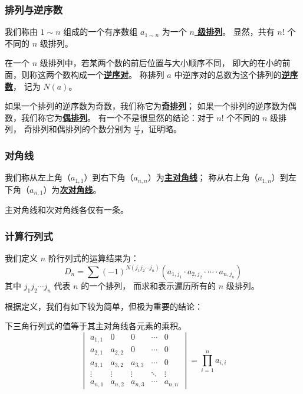 \documentclass[UTF8]{article}
\begin{document}
	\subsubsection{排列与逆序数}

	我们称由 $1 \sim n$ 组成的一个有序数组
	$a_{1 \sim n}$ 为一个 \textbf{\uline{$n$ 级排列}}。
	显然，共有 $n!$ 个不同的 $n$ 级排列。

	在一个 $n$ 级排列中，若某两个数的前后位置与大小顺序不同，
	即大的在小的前面，则称这两个数构成一个\textbf{\uline{逆序对}}。
	称排列 $a$ 中逆序对的总数为这个排列的\textbf{\uline{逆序数}}，
	记为 $N(a)$。

	如果一个排列的逆序数为奇数，我们称它为\textbf{\uline{奇排列}}；
	如果一个排列的逆序数为偶数，我们称它为\textbf{\uline{偶排列}}。
	有一个不是很显然的结论：对于 $n!$ 个不同的 $n$ 级排列，
	奇排列和偶排列的个数分别为 $\frac {n!} {2}$，证明略。

	\subsubsection{对角线}

	我们称从左上角（$a_{1, 1}$）到右下角（$a_{n, n}$）为\textbf{\uline{主对角线}}；
	称从右上角（$a_{1, n}$）到左下角（$a_{n, 1}$）为\textbf{\uline{次对角线}}。

	主对角线和次对角线各仅有一条。

	\subsubsection{计算行列式}

	我们定义 $n$ 阶行列式的运算结果为：
	\begin{equation*}
		D_n =
		\sum (-1)^{N(j_1 j_2 \cdots j_n)}
		(a_{1, j_1} \cdot a_{2, j_2} \cdot \cdots \cdot a_{n, j_n})
	\end{equation*}
	其中 $j_1 j_2 \cdots j_n$ 代表 $n$ 的一个排列，
	而求和表示遍历所有的 $n$ 级排列。

	\bigskip

	根据定义，我们有如下较为简单，但极为重要的结论：

	\newtheorem{theorema}{}

	{\theorema 下三角行列式的值等于其主对角线各元素的乘积。}
	\begin{equation*}
		\begin{vmatrix}
			a_{1, 1} & 0 & 0 & \cdots & 0
			\\
			a_{2, 1} & a_{2, 2} & 0 & \cdots & 0
			\\
			a_{3, 1} & a_{3, 2} & a_{3, 3} & \cdots & 0
			\\
			\vdots & \vdots & \vdots & \ddots & \vdots
			\\
			a_{n, 1} & a_{n, 2} & a_{n, 3} & \cdots & a_{n, n}
		\end{vmatrix}
		=
		\prod_{i = 1}^{n} a_{i, i}
	\end{equation*}
\end{document}
